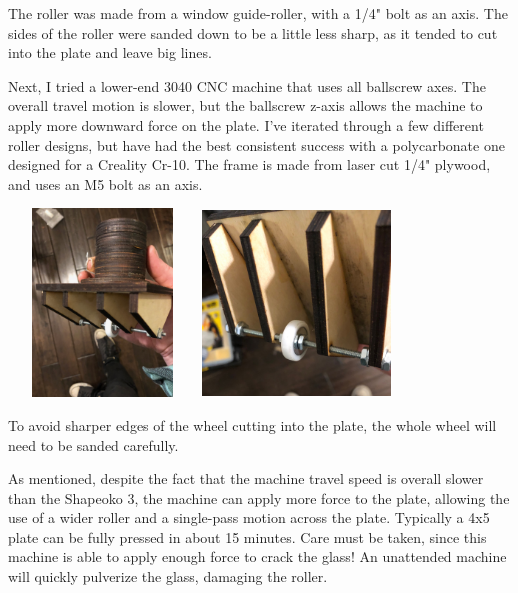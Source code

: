 \documentclass[11pt]{article}
\begin{document}
The roller was made from a window guide-roller, with a 1/4" bolt as an axis. The sides of the roller were sanded down to be a little less sharp, as it tended to cut into the plate and leave big lines.\newline


Next, I tried a lower-end 3040 CNC machine that uses all ballscrew axes. The overall travel motion is slower, but the ballscrew z-axis allows the machine to apply more downward force on the plate. I've iterated through a few different roller designs, but have had the best consistent success with a polycarbonate one designed for a Creality Cr-10. The frame is made from laser cut 1/4" plywood, and uses an M5 bolt as an axis.\newline

\begin{center}
\includegraphics[width=5cm, height=5cm]{img/part1_32.jpg}
\includegraphics[width=5cm, height=5cm]{img/part1_33.jpg}
\end{center}

To avoid sharper edges of the wheel cutting into the plate, the whole wheel will need to be sanded carefully.\newline

As mentioned, despite the fact that the machine travel speed is overall slower than the Shapeoko 3, the machine can apply more force to the plate, allowing the use of a wider roller and a single-pass motion across the plate. Typically a 4x5 plate can be fully pressed in about 15 minutes. Care must be taken, since this machine is able to apply enough force to crack the glass! An unattended machine will quickly pulverize the glass, damaging the roller.\newline
\end{document}
